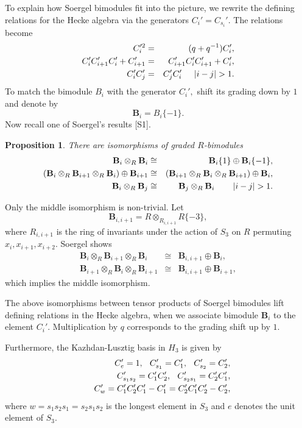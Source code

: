 \documentclass[12pt]{article}
\newtheorem{prop}{Proposition}
\begin{document}
To explain how Soergel bimodules fit into the picture, 
we rewrite the defining relations for the Hecke algebra  
via the generators $C_i'=C_{s_i}'.$ The relations become 
\begin{eqnarray*} 
     C_i'^2 & = & (q+q^{-1}) C_i', \\
     C_i' C_{i+1}' C_i' + C_{i+1}' & = & 
     C_{i+1}' C_i' C_{i+1}'  +  C_i', \\
     C_i' C_j' & = & C_j' C_i'   
    \hspace{0.2in} |i-j|>1. 
\end{eqnarray*} 
To match the bimodule $B_i$ with the generator $C_i',$ 
shift its grading down by $1$ and denote by 
$$\mathbf{B}_i = B_i \{ -1\}.$$ 
Now recall one of Soergel's results [S1]. 
\begin{prop} There are isomorphisms of graded $R$-bimodules 
 \begin{eqnarray*} 
    \mathbf{B}_i \otimes_R \mathbf{B}_i & \cong &  \mathbf{B}_i\{1\} 
 \oplus \mathbf{B}_i \{-1\}, \\
    (\mathbf{B}_i \otimes_R \mathbf{B}_{i+1} \otimes_R \mathbf{B}_{i}) 
 \oplus \mathbf{B}_{i+1} 
    & \cong & 
    (\mathbf{B}_{i+1} \otimes_R \mathbf{B}_i \otimes_R \mathbf{B}_{i+1})
 \oplus \mathbf{B}_i, \\   
 \mathbf{B}_i \otimes_R \mathbf{B}_j & \cong & 
 \mathbf{B}_j \otimes_R \mathbf{B}_i \hspace{0.3in} |i-j|>1. 
\end{eqnarray*} 
\end{prop} 
Only the middle isomorphism is non-trivial. Let
$$\mathbf{B}_{i,i+1} = R\otimes_{R_{i,i+1}} R\{-3\},$$
where $R_{i,i+1}$ is the ring of invariants under the action of $S_3$ 
on $R$ permuting $x_i,x_{i+1},x_{i+2}.$ Soergel shows 
\begin{eqnarray*} 
   \mathbf{B}_i \otimes_R \mathbf{B}_{i+1} \otimes_R \mathbf{B}_{i} &  
     \cong & \mathbf{B}_{i,i+1}\oplus \mathbf{B}_i,   \\
  \mathbf{B}_{i+1} \otimes_R \mathbf{B}_i \otimes_R \mathbf{B}_{i+1} &  
     \cong & \mathbf{B}_{i,i+1}\oplus \mathbf{B}_{i+1}, 
\end{eqnarray*} 
which implies the middle isomorphism. 

The above isomorphisms between tensor products of Soergel bimodules 
lift defining relations in the Hecke algebra, when we associate 
bimodule $\mathbf{B}_i$ to the element $C_i'.$ Multiplication by 
$q$ corresponds to the grading shift up by $1.$ 

Furthermore, the Kazhdan-Lusztig basis in $H_3$ is given by 
\begin{eqnarray*} 
& & C_{e}' = 1, \hspace{0.1in} C_{s_1}' = C_1', \hspace{0.1in} 
 C_{s_2}' = C_2', \\
& & C_{s_1s_2}' = C_1' C_2', \hspace{0.1in} C_{s_2s_1}' = C_2' C_1', \\
& & C_{w}' = C_1' C_2' C_1' - C_1' = C_2'C_1'C_2' - C_2',
\end{eqnarray*} 
where $w=s_1s_2s_1=s_2s_1s_2$ is the longest element in $S_3$ and 
$e$ denotes the unit element of $S_3.$  
\end{document}
